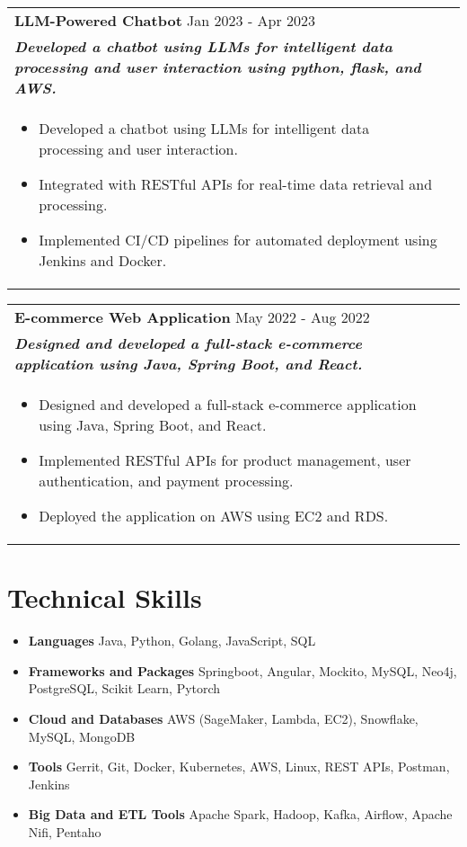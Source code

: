\documentclass[a4paper,3pt]{article}
\begin{document}
\begin{tabularx}{\linewidth}{ @{}l r@{} }
\textbf{LLM-Powered Chatbot} \hfill  Jan 2023 - Apr 2023  \\[2pt]
\textbf{\textit{Developed a chatbot using LLMs for intelligent data processing and user interaction using python, flask, and AWS.}} \hfill\\[2pt]
\begin{minipage}[t]{\linewidth}
    \begin{itemize}[nosep,after=\strut, leftmargin=2em, itemsep=2pt]
        \item Developed a chatbot using LLMs for intelligent data processing and user interaction.
\item Integrated with RESTful APIs for real-time data retrieval and processing.
\item Implemented CI/CD pipelines for automated deployment using Jenkins and Docker.  
    \end{itemize}
    \end{minipage}
\end{tabularx}
\begin{tabularx}{\linewidth}{ @{}l r@{} }
\textbf{E-commerce Web Application} \hfill  May 2022 - Aug 2022  \\[2pt]
\textbf{\textit{Designed and developed a full-stack e-commerce application using Java, Spring Boot, and React.}} \hfill\\[2pt]
\begin{minipage}[t]{\linewidth}
    \begin{itemize}[nosep,after=\strut, leftmargin=2em, itemsep=2pt]
        \item Designed and developed a full-stack e-commerce application using Java, Spring Boot, and React.
\item Implemented RESTful APIs for product management, user authentication, and payment processing.
\item Deployed the application on AWS using EC2 and RDS.  
    \end{itemize}
    \end{minipage}
\end{tabularx}


\section{Technical Skills}
\begin{itemize}[nosep,after=\strut, leftmargin=2em, itemsep=1pt]
    \item \textbf{Languages}
\hfill     Java, Python, Golang, JavaScript, SQL 
\item \textbf{Frameworks and Packages}
\hfill     Springboot, Angular, Mockito, MySQL, Neo4j, PostgreSQL, Scikit Learn, Pytorch 
\item \textbf{Cloud and Databases}
\hfill     AWS (SageMaker, Lambda, EC2), Snowflake, MySQL, MongoDB 
\item \textbf{Tools}
\hfill     Gerrit, Git, Docker, Kubernetes, AWS, Linux, REST APIs, Postman, Jenkins 
\item \textbf{Big Data and ETL Tools}
\hfill     Apache Spark, Hadoop, Kafka, Airflow, Apache Nifi, Pentaho 
     \end{itemize}
\end{document}
